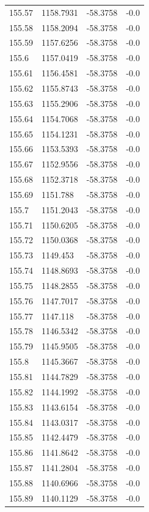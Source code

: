 \begin{table}[H]
\begin{tabular}{llll}
155.57 & 1158.7931 & -58.3758 & -0.0 \\
155.58 & 1158.2094 & -58.3758 & -0.0 \\
155.59 & 1157.6256 & -58.3758 & -0.0 \\
155.6 & 1157.0419 & -58.3758 & -0.0 \\
155.61 & 1156.4581 & -58.3758 & -0.0 \\
155.62 & 1155.8743 & -58.3758 & -0.0 \\
155.63 & 1155.2906 & -58.3758 & -0.0 \\
155.64 & 1154.7068 & -58.3758 & -0.0 \\
155.65 & 1154.1231 & -58.3758 & -0.0 \\
155.66 & 1153.5393 & -58.3758 & -0.0 \\
155.67 & 1152.9556 & -58.3758 & -0.0 \\
155.68 & 1152.3718 & -58.3758 & -0.0 \\
155.69 & 1151.788 & -58.3758 & -0.0 \\
155.7 & 1151.2043 & -58.3758 & -0.0 \\
155.71 & 1150.6205 & -58.3758 & -0.0 \\
155.72 & 1150.0368 & -58.3758 & -0.0 \\
155.73 & 1149.453 & -58.3758 & -0.0 \\
155.74 & 1148.8693 & -58.3758 & -0.0 \\
155.75 & 1148.2855 & -58.3758 & -0.0 \\
155.76 & 1147.7017 & -58.3758 & -0.0 \\
155.77 & 1147.118 & -58.3758 & -0.0 \\
155.78 & 1146.5342 & -58.3758 & -0.0 \\
155.79 & 1145.9505 & -58.3758 & -0.0 \\
155.8 & 1145.3667 & -58.3758 & -0.0 \\
155.81 & 1144.7829 & -58.3758 & -0.0 \\
155.82 & 1144.1992 & -58.3758 & -0.0 \\
155.83 & 1143.6154 & -58.3758 & -0.0 \\
155.84 & 1143.0317 & -58.3758 & -0.0 \\
155.85 & 1142.4479 & -58.3758 & -0.0 \\
155.86 & 1141.8642 & -58.3758 & -0.0 \\
155.87 & 1141.2804 & -58.3758 & -0.0 \\
155.88 & 1140.6966 & -58.3758 & -0.0 \\
155.89 & 1140.1129 & -58.3758 & -0.0 \\

\end{tabular}
\end{table}
